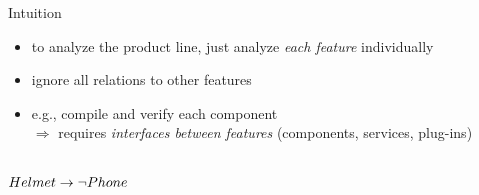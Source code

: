 \begin{frame}{\myframetitle}
	\begin{fancycolumns}
		\begin{definition}{Intuition}
			\begin{itemize}
				\item to analyze the product line, just analyze \emph{each feature} individually
				\item ignore all relations to other features
				\item e.g., compile and verify each component\\
				$\Rightarrow$ requires \emph{interfaces between features} (components, services, plug-ins) %
			\end{itemize}
		\end{definition}
		\begin{exampletight}{}
			\centering\featureDiagramLego\\$Helmet \rightarrow \neg Phone$
		\end{exampletight}
	\nextcolumn
	\end{fancycolumns}
\end{frame}

